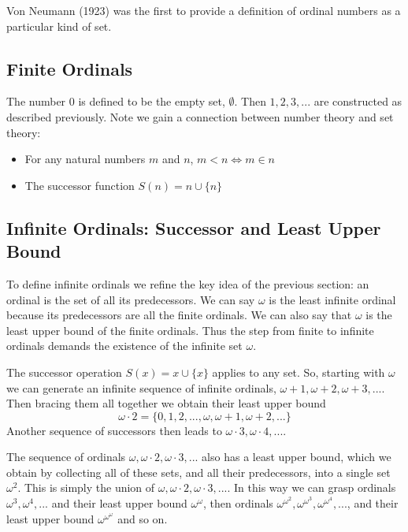 \documentclass[12pt, a4paper, oneside, openright, titlepage]{book}
\begin{document}
Von Neumann (1923) was the first to provide a definition of ordinal numbers as a particular kind of set. 


\subsection{Finite Ordinals}

The number $0$ is defined to be the empty set, $\emptyset$. Then $1,2,3,...$ are constructed as described previously. Note we gain a connection between number theory and set theory:
\begin{itemize}
    \item For any natural numbers $m$ and $n$, $m < n \iff m \in n$
    \item The successor function $S(n) = n\cup \{n\}$
\end{itemize}

\subsection{Infinite Ordinals: Successor and Least Upper Bound}

To define infinite ordinals we refine the key idea of the previous section: an ordinal is the set of all its predecessors. We can say $\omega$ is the least infinite ordinal because its predecessors are all the finite ordinals. We can also say that $\omega$ is the least upper bound of the finite ordinals. Thus the step from finite to infinite ordinals demands the existence of the infinite set $\omega$. 

The successor operation $S(x) = x\cup \{x\}$ applies to any set. So, starting with $\omega$ we can generate an infinite sequence of infinite ordinals, $\omega+1,\omega+2,\omega+3,...$. Then bracing them all together we obtain their least upper bound \begin{equation*}
    \omega\cdot 2 = \{0,1,2,...,\omega,\omega+1,\omega+2,...\}
\end{equation*}
Another sequence of successors then leads to $\omega\cdot 3,\omega \cdot 4,...$.

The sequence of ordinals $\omega,\omega\cdot 2,\omega\cdot 3,...$ also has a least upper bound, which we obtain by collecting all of these sets, and all their predecessors, into a single set $\omega^2$. This is simply the union of $\omega,\omega\cdot 2,\omega\cdot 3,...$. In this way we can grasp ordinals $\omega^3,\omega^4,...$ and their least upper bound $\omega^{\omega}$, then ordinals $\omega^{\omega^2},\omega^{\omega^3},\omega^{\omega^4},...$, and their least upper bound $\omega^{\omega^{\omega}}$ and so on.
\end{document}
